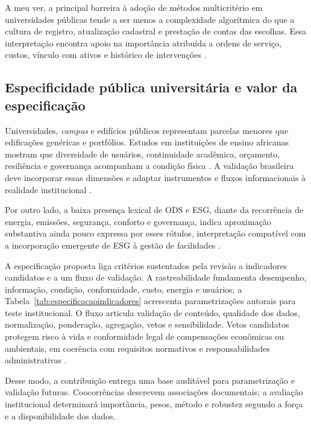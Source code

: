 A meu ver, a principal barreira à adoção de métodos multicritério em universidades públicas tende a ser menos a complexidade algorítmica do que a cultura de registro, atualização cadastral e prestação de contas das escolhas. Essa interpretação encontra apoio na importância atribuída a ordens de serviço, custos, vínculo com ativos e histórico de intervenções \parencite{martins_custosmanutencaoses_2024,morais_eficienciamanutencao_2023}.

\subsection{Especificidade pública universitária e valor da especificação}

Universidades, \textit{campus} e edifícios públicos representam parcelas menores que edificações genéricas e portfólios. Estudos em instituições de ensino africanas mostram que diversidade de usuários, continuidade acadêmica, orçamento, resiliência e governança acompanham a condição física \parencite{awuzie_fmuniversidades_2017,ndukuba_resilienciainstitucional_2025}. A validação brasileira deve incorporar essas dimensões e adaptar instrumentos e fluxos informacionais à realidade institucional \parencite{talib_hospitalfm_2013,tan_fluxoinformacao_2018}.

Por outro lado, a baixa presença lexical de ODS e ESG, diante da recorrência de energia, emissões, segurança, conforto e governança, indica aproximação substantiva ainda pouco expressa por esses rótulos, interpretação compatível com a incorporação emergente de ESG à gestão de facilidades \parencite{ramantswana_esgfm_2026}.

A especificação proposta liga critérios sustentados pela revisão a indicadores candidatos e a um fluxo de validação. A rastreabilidade fundamenta desempenho, informação, condição, conformidade, custo, energia e usuários; a Tabela~\ref{tab:especificacaoindicadores} acrescenta parametrizações autorais para teste institucional. O fluxo articula validação de conteúdo, qualidade dos dados, normalização, ponderação, agregação, vetos e sensibilidade. Vetos candidatos protegem risco à vida e conformidade legal de compensações econômicas ou ambientais, em coerência com requisitos normativos e responsabilidades administrativas \parencite{abnt_nbr5674_2012,araujoneto_manutencaolegislacao_2015}.

Desse modo, a contribuição entrega uma base auditável para parametrização e validação futuras. Coocorrências descrevem associações documentais; a avaliação institucional determinará importância, pesos, método e robustez segundo a força e a disponibilidade dos dados.
